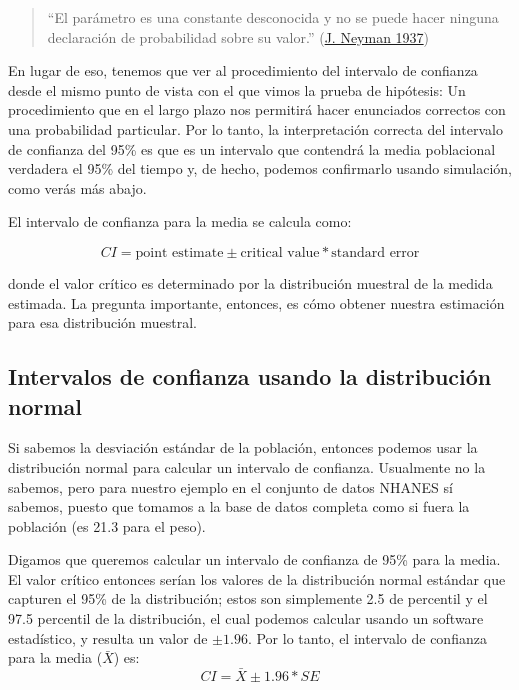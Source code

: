 \documentclass[
  12pt,
]{book}
\begin{document}
\begin{quote}
``El parámetro es una constante desconocida y no se puede hacer ninguna declaración de probabilidad sobre su valor.'' (\protect\hyperlink{ref-Neyman37}{J. Neyman 1937})
\end{quote}

En lugar de eso, tenemos que ver al procedimiento del intervalo de confianza desde el mismo punto de vista con el que vimos la prueba de hipótesis: Un procedimiento que en el largo plazo nos permitirá hacer enunciados correctos con una probabilidad particular. Por lo tanto, la interpretación correcta del intervalo de confianza del 95\% es que es un intervalo que contendrá la media poblacional verdadera el 95\% del tiempo y, de hecho, podemos confirmarlo usando simulación, como verás más abajo.

El intervalo de confianza para la media se calcula como:

\[
CI = \text{point estimate} \pm \text{critical value} * \text{standard error}
\]

donde el valor crítico es determinado por la distribución muestral de la medida estimada. La pregunta importante, entonces, es cómo obtener nuestra estimación para esa distribución muestral.

\hypertarget{intervalos-de-confianza-usando-la-distribuciuxf3n-normal}{%
\subsection{Intervalos de confianza usando la distribución normal}\label{intervalos-de-confianza-usando-la-distribuciuxf3n-normal}}

Si sabemos la desviación estándar de la población, entonces podemos usar la distribución normal para calcular un intervalo de confianza. Usualmente no la sabemos, pero para nuestro ejemplo en el conjunto de datos NHANES sí sabemos, puesto que tomamos a la base de datos completa como si fuera la población (es 21.3 para el peso).

Digamos que queremos calcular un intervalo de confianza de 95\% para la media. El valor crítico entonces serían los valores de la distribución normal estándar que capturen el 95\% de la distribución; estos son simplemente 2.5 de percentil y el 97.5 percentil de la distribución, el cual podemos calcular usando un software estadístico, y resulta un valor de \(\pm 1.96\). Por lo tanto, el intervalo de confianza para la media (\(\bar{X}\)) es:
\[
CI = \bar{X} \pm 1.96*SE
\]
\end{document}
